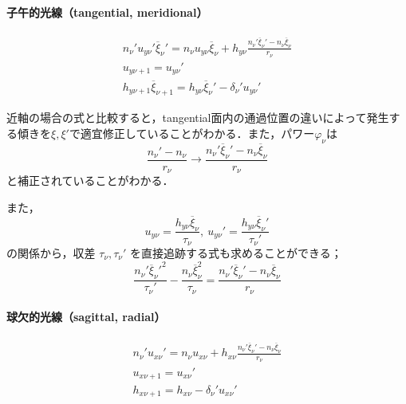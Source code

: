 \documentclass{jsarticle}
\begin{document}
\paragraph{子午的光線（tangential, meridional）}

\begin{gather}
    n_\nu'u_{y\nu}'\overline{\xi}_{\nu}'=n_\nu u_{y\nu}\overline{\xi}_{\nu}+h_{y\nu}\frac{n_\nu'\overline{\xi}_\nu'-n_\nu\overline{\xi}_\nu}{r_\nu}
    \label{eq:tangential_tracing_1} \\
    u_{y\nu+1}=u_{y\nu}'
    \label{eq:tangential_tracing_2} \\
    h_{y\nu+1}\overline{\xi}_{\nu+1}=h_{y\nu}\overline{\xi}_{\nu}'-\delta_\nu'u_{y\nu}'
    \label{eq:tangential_tracing_3}
\end{gather}

近軸の場合の式と比較すると，tangential面内の通過位置の違いによって発生する傾きを$\xi,\xi'$で適宜修正していることがわかる．また，パワー$\varphi_\nu$は
\begin{equation}
    \frac{n_\nu'-n_\nu}{r_\nu}
    \longrightarrow
    \frac{n_\nu'\overline{\xi}_\nu'-n_\nu\overline{\xi}_\nu}{r_\nu}
\end{equation}
と補正されていることがわかる．

また，
\begin{equation}
    u_{y\nu}=\frac{h_{y\nu}\overline{\xi}_\nu}{\tau_\nu},\ u_{y\nu}'=\frac{h_{y\nu}\overline{\xi}_\nu'}{\tau_\nu'}
\end{equation}
の関係から，収差 $\tau_\nu, \tau_\nu'$ を直接追跡する式も求めることができる；
\begin{equation}
    \frac{n_\nu' {\overline{\xi}_\nu'}^2}{\tau_\nu'}-\frac{n_\nu \overline{\xi}_\nu^2}{\tau_\nu}=\frac{n_\nu'\overline{\xi}_\nu'-n_\nu\overline{\xi}_\nu}{r_\nu}
\end{equation}

\paragraph{球欠的光線（sagittal, radial）}
\begin{gather}
    n_\nu'u_{x\nu}'=n_\nu u_{x\nu}+h_{x\nu}\frac{n_\nu'\overline{\xi}_\nu'-n_\nu\overline{\xi}_\nu}{r_\nu}
    \label{eq:sagittal_tracing_1} \\
    u_{x\nu+1}=u_{x\nu}'
    \label{eq:sagittal_tracing_2} \\
    h_{x\nu+1}=h_{x\nu}-\delta_\nu'u_{x\nu}'
    \label{eq:sagittal_tracing_3}
\end{gather}
\end{document}
